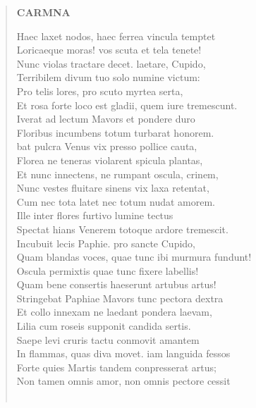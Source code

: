 \documentclass[11pt, a4paper]{report}
\begin{document}
\begin{verse}
    \begin{center} \textbf{CARMNA} \end{center} \marginpar{[206]} Haec laxet nodos, haec ferrea vincula temptet \\ Loricaeque moras! vos scuta et tela tenete! \\ Nunc violas tractare decet. laetare, Cupido, \\ Terribilem divum tuo solo numine victum: \\ Pro telis lores, pro scuto myrtea serta, \\ Et rosa forte loco est gladii, quem iure tremescunt. \\ Iverat ad lectum Mavors et pondere duro \\ Floribus incumbens totum turbarat honorem. \\ bat pulcra Venus vix presso pollice cauta, \\ Florea ne teneras violarent spicula plantas, \\ Et nunc innectens, ne rumpant oscula, crinem, \\ Nunc vestes fluitare sinens vix laxa retentat, \\ Cum nec tota latet nec totum nudat amorem. \\ Ille inter flores furtivo lumine tectus \\ Spectat hians Venerem totoque ardore tremescit. \\ Incubuit lecis Paphie. pro sancte Cupido, \\ Quam blandas voces, quae tunc ibi murmura fundunt! \\ Oscula permixtis quae tunc fixere labellis! \\ Quam bene consertis haeserunt artubus artus! \\ Stringebat Paphiae Mavors tunc pectora dextra \\ Et collo innexam ne laedant pondera laevam, \\ Lilia cum roseis supponit candida sertis. \\ Saepe levi cruris tactu conmovit amantem \\ In flammas, quas diva movet. iam languida fessos \\ Forte quies Martis tandem conpresserat artus; \\ Non tamen omnis amor, non omnis pectore cessit \\ 
        ﻿\pagebreak 

\end{verse}
\end{document}
